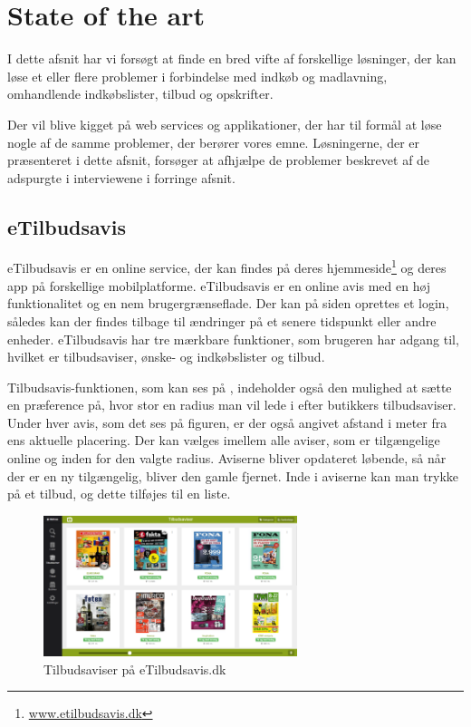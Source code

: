 \newpage
\section{State of the art}\label{s:SOTA}
I dette afsnit har vi forsøgt at finde en bred vifte af forskellige løsninger, der kan løse et eller flere problemer i forbindelse med indkøb og madlavning, omhandlende indkøbslister, tilbud og opskrifter.

Der vil blive kigget på web services og applikationer, der har til formål at løse nogle af de samme problemer, der berører vores emne.
Løsningerne, der er præsenteret i dette afsnit, forsøger at afhjælpe de problemer beskrevet af de adspurgte i interviewene i forringe afsnit.

\subsection{eTilbudsavis}
eTilbudsavis er en online service, der kan findes på deres hjemmeside\footnote{\underline{www.etilbudsavis.dk}} og deres app på forskellige mobilplatforme.
eTilbudsavis er en online avis med en høj funktionalitet og en nem brugergrænseflade.
Der kan på siden oprettes et login, således kan der findes tilbage til ændringer på et senere tidspunkt eller andre enheder.
eTilbudsavis har tre mærkbare funktioner, som brugeren har adgang til, hvilket er tilbudsaviser, ønske- og indkøbslister og tilbud.

Tilbudsavis-funktionen, som kan ses på , indeholder også den mulighed at sætte en præference på, hvor stor en radius man vil lede i efter butikkers tilbudsaviser.
Under hver avis, som det ses på figuren, er der også angivet afstand i meter fra ens aktuelle placering.
Der kan vælges imellem alle aviser, som er tilgængelige online og inden for den valgte radius.
Aviserne bliver opdateret løbende, så når der er en ny tilgængelig, bliver den gamle fjernet.
Inde i aviserne kan man trykke på et tilbud, og dette tilføjes til en liste.

\begin{figure}
\vspace{-20pt}
	\begin{center}
		\includegraphics[width=0.66\textwidth]{images/Images/eTilbudsavis.PNG}
	\end{center}
	\vspace{-20pt}
	\caption{Tilbudsaviser på eTilbudsavis.dk}\label{ss:eTilbudsavis}
	\vspace{-20pt}
\end{figure}

